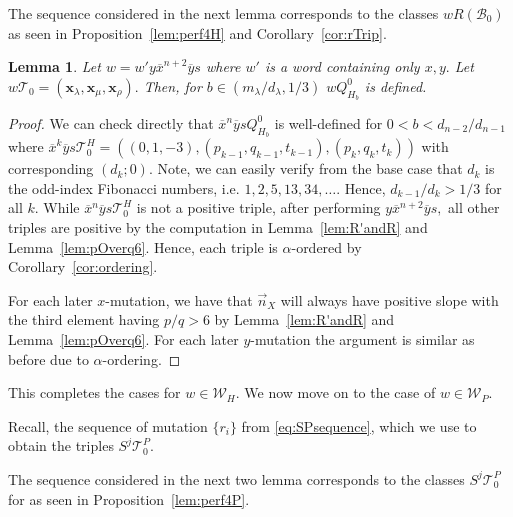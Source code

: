 \documentclass[11pt, reqno]{amsart}
\newtheorem{lemma}[thm]{Lemma}
\theoremstyle{remark}
\numberwithin{equation}{subsection}
\numberwithin{figure}{section}
\theoremstyle{customremark}
\newcommand{\Tt}{\mathcal{T}}
\newcommand{\vn}{{\vec{n}}}
\newcommand{\ov}{\overline}
\newcommand{\al}{{\alpha}}
\newcommand{\la}{{\lambda}}
\begin{document}
 The sequence considered in the next lemma corresponds to the classes $wR(\mathcal{B}_{0})$ as seen in Proposition~\ref{lem:perf4H} and Corollary~\ref{cor:rTrip}. 
\begin{lemma} \label{lem:bDefH5}
    Let $w=w'y\ov{x}^{n+2}\ov{y}s$ where $w'$ is a word containing only $x,y.$ Let $w\Tt_0=(\bm{x}_\la,\bm{x}_{\mu},\bm{x}_\rho).$ Then, for $b \in (m_\la/d_\la,1/3)$ $wQ_{H_b}^0$ is defined. 
\end{lemma}
\begin{proof}
    We can check directly that $\ov{x}^{n}\ov{y}sQ_{H_b}^0$ is well-defined for $0<b<d_{n-2}/d_{n-1}$
    where $\ov{x}^{k}\ov{y}s\Tt_0^H=((0,1,-3),(p_{k-1},q_{k-1},t_{k-1}),(p_k,q_k,t_k))$ with corresponding $(d_k;0).$ Note, we can easily verify from the base case that $d_k$ is the odd-index Fibonacci numbers, i.e. $1,2,5,13,34,\hdots$. Hence, $d_{k-1}/d_k >1/3$ for all $k.$ While $\ov{x}^{n}\ov{y}s\Tt_0^H$ is not a positive triple, after performing $y\ov{x}^{n+2}\ov{y}s,$ all other triples are positive by the computation in Lemma~\ref{lem:R'andR} and Lemma~\ref{lem:pOverq6}. Hence, each triple is $\al$-ordered by Corollary~\ref{cor:ordering}.

    For each later $x$-mutation, we have that $\vn_X$ will always have positive slope with the third element having $p/q>6$ by Lemma~\ref{lem:R'andR} and Lemma~\ref{lem:pOverq6}. For each later $y$-mutation the argument is similar as before due to $\al$-ordering. 

\end{proof}
This completes the cases for $w \in \mathcal{W}_H.$ We now move on to the case of $w \in \mathcal{W}_P.$

Recall, the sequence of mutation $\{r_i\}$ from \eqref{eq:SPsequence}, which we use to obtain the triples $S^j\Tt_0^P.$


The sequence considered in the next two lemma corresponds to the classes $S^j\Tt_0^P$ for as seen in Proposition~\ref{lem:perf4P}. 
 
\end{document}
